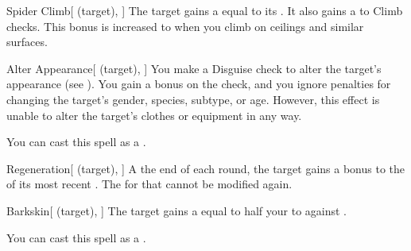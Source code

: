 \lowercase{\hypertarget{spell:Spider Climb}{}}\label{spell:Spider Climb}
\begin{attuneability}[Rank 1]{\hypertarget{spell:Spider Climb}{Spider Climb}}[ (target), ]
The target gains a  equal to its .
It also gains a   to Climb checks.
This bonus is increased to  when you climb on ceilings and similar surfaces.
\end{attuneability}
\vspace{0.25em}



\lowercase{\hypertarget{spell:Alter Appearance}{}}\label{spell:Alter Appearance}
\begin{attuneability}[Rank 3]{\hypertarget{spell:Alter Appearance}{Alter Appearance}}[ (target), ]
You make a Disguise check to alter the target's appearance (see ).
You gain a  bonus on the check, and you ignore penalties for changing the target's gender, species, subtype, or age.
However, this effect is unable to alter the target's clothes or equipment in any way.

You can cast this spell as a .
\end{attuneability}
\vspace{0.25em}



\lowercase{\hypertarget{spell:Regeneration}{}}\label{spell:Regeneration}
\begin{attuneability}[Rank 3]{\hypertarget{spell:Regeneration}{Regeneration}}[ (target), ]
A the end of each round, the target gains a  bonus to the  of its most recent .
The  for that  cannot be modified again.
\end{attuneability}
\vspace{0.25em}



\lowercase{\hypertarget{spell:Barkskin}{}}\label{spell:Barkskin}
\begin{attuneability}[Rank 4]{\hypertarget{spell:Barkskin}{Barkskin}}[ (target), ]
The target gains a  equal to half your  to  against .

You can cast this spell as a .
\end{attuneability}
\vspace{0.25em}



